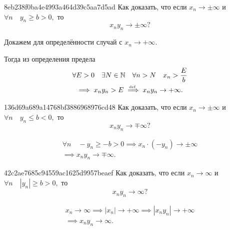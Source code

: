     \begin{note}{8eb238f0ba4e4993a464d39c5aa7d5ad}
        Как доказать, что если \( x_n \to \pm \infty  \) и \( \forall n \quad y_n \geqslant b > 0,  \) то \[
            x_n y_n \to \pm \infty?
        \]

        \begin{cloze}{1}
            Докажем для определённости случай с \( x_n \to +\infty. \)

            Тогда из определения предела
            \begin{multline*}
                \forall E > 0 \quad \exists N \in \mathbb N \quad \forall n > N \quad x_n > \frac{E}{b} \\
                \implies x_n y_n > E \overset{\!\!\text{\tiny def}}\implies x_n y_n \to +\infty.
            \end{multline*}
        \end{cloze}
    \end{note}

    \begin{note}{136d69a689a14768bf3886968976cd48}
        Как доказать, что если \( x_n \to \pm \infty  \) и \( \forall n \quad y_n \leqslant b < 0,  \) то \[
            x_n y_n \to \mp \infty?
        \]

        \begin{cloze}{1}
            \begin{multline*}
                \forall n \quad -y_n \geqslant -b > 0
                \implies x_n \operatorname{\cdot} (-y_n) \to \pm \infty \\
                \implies x_n y_n \to \mp \infty.
            \end{multline*}
        \end{cloze}
    \end{note}

    \begin{note}{42c2ae7685c94559ac1625d9957beaef}
        Как доказать, что если \( x_n \to \infty  \) и \( \forall n \quad |y_n| \geqslant b > 0,  \) то \[
            x_n y_n \to \infty?
        \]

        \begin{cloze}{1}
            \begin{multline*}
                x_n \to \infty \implies |x_n| \to +\infty \implies |x_n y_n| \to +\infty \\
                \implies x_n y_n \to \infty.
            \end{multline*}
        \end{cloze}
    \end{note}

